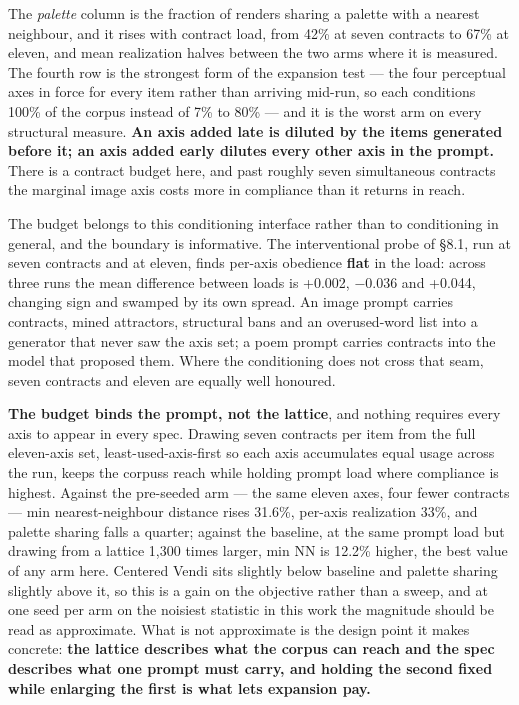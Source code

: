 \documentclass[
  10pt,
]{article}
\theoremstyle{plain}
\theoremstyle{definition}
\begin{document}
The \emph{palette} column is the fraction of renders sharing a palette
with a nearest neighbour, and it rises with contract load, from 42\% at
seven contracts to 67\% at eleven, and mean realization halves between
the two arms where it is measured. The fourth row is the strongest form
of the expansion test --- the four perceptual axes in force for every
item rather than arriving mid-run, so each conditions 100\% of the
corpus instead of 7\% to 80\% --- and it is the worst arm on every
structural measure. \textbf{An axis added late is diluted by the items
generated before it; an axis added early dilutes every other axis in the
prompt.} There is a contract budget here, and past roughly seven
simultaneous contracts the marginal image axis costs more in compliance
than it returns in reach.

The budget belongs to this conditioning interface rather than to
conditioning in general, and the boundary is informative. The
interventional probe of §8.1, run at seven contracts and at eleven,
finds per-axis obedience \textbf{flat} in the load: across three runs
the mean difference between loads is +0.002, −0.036 and +0.044, changing
sign and swamped by its own spread. An image prompt carries contracts,
mined attractors, structural bans and an overused-word list into a
generator that never saw the axis set; a poem prompt carries contracts
into the model that proposed them. Where the conditioning does not cross
that seam, seven contracts and eleven are equally well honoured.

\textbf{The budget binds the prompt, not the lattice}, and nothing
requires every axis to appear in every spec. Drawing seven contracts per
item from the full eleven-axis set, least-used-axis-first so each axis
accumulates equal usage across the run, keeps the
corpus\textquotesingle s reach while holding prompt load where
compliance is highest. Against the pre-seeded arm --- the same eleven
axes, four fewer contracts --- min nearest-neighbour distance rises
31.6\%, per-axis realization 33\%, and palette sharing falls a quarter;
against the baseline, at the same prompt load but drawing from a lattice
1,300 times larger, min NN is 12.2\% higher, the best value of any arm
here. Centered Vendi sits slightly below baseline and palette sharing
slightly above it, so this is a gain on the objective rather than a
sweep, and at one seed per arm on the noisiest statistic in this work
the magnitude should be read as approximate. What is not approximate is
the design point it makes concrete: \textbf{the lattice describes what
the corpus can reach and the spec describes what one prompt must carry,
and holding the second fixed while enlarging the first is what lets
expansion pay.}
\end{document}
